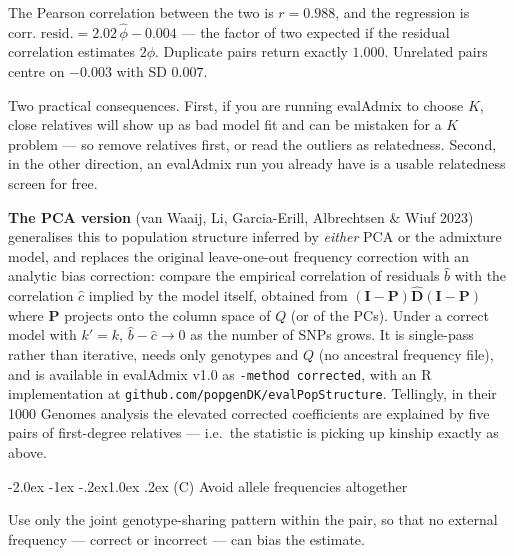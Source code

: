\documentclass[10pt,a4paper]{article}
\makeatletter
\renewcommand\subsection{\@startsection{subsection}{2}{\z@}%
  {-2.0ex \@plus -1ex \@minus -.2ex}{1.0ex \@plus.2ex}%
  {\normalfont\normalsize\bfseries\color{hdr}}}
\makeatother
\begin{document}
\noindent
The Pearson correlation between the two is $r=0.988$, and the regression is
$\text{corr.\ resid.} = 2.02\,\hat\phi - 0.004$ --- the factor of two expected if the residual correlation
estimates $2\phi$. Duplicate pairs return exactly $1.000$. Unrelated pairs centre on $-0.003$ with
SD $0.007$.

Two practical consequences. First, if you are running evalAdmix to choose $K$, close relatives will show up
as bad model fit and can be mistaken for a $K$ problem --- so remove relatives first, or read the outliers
as relatedness. Second, in the other direction, an evalAdmix run you already have is a usable relatedness
screen for free.

\textbf{The PCA version} (van Waaij, Li, Garcia-Erill, Albrechtsen \& Wiuf 2023) generalises this to
population structure inferred by \emph{either} PCA or the admixture model, and replaces the original
leave-one-out frequency correction with an analytic bias correction: compare the empirical correlation of
residuals $\hat b$ with the correlation $\hat c$ implied by the model itself, obtained from
$(\mathbf{I}-\mathbf{P})\hat{\mathbf{D}}(\mathbf{I}-\mathbf{P})$ where $\mathbf{P}$ projects onto the column
space of $Q$ (or of the PCs). Under a correct model with $k'=k$, $\hat b - \hat c \to 0$ as the number of
SNPs grows. It is single-pass rather than iterative, needs only genotypes and $Q$ (no ancestral frequency
file), and is available in evalAdmix v1.0 as \texttt{-method corrected}, with an R implementation at
\texttt{github.com/popgenDK/evalPopStructure}. Tellingly, in their 1000 Genomes analysis the elevated
corrected coefficients are explained by five pairs of first-degree relatives --- i.e.\ the statistic
is picking up kinship exactly as above.

\subsection{(C) Avoid allele frequencies altogether}

Use only the joint genotype-sharing pattern within the pair, so that no external frequency --- correct or
incorrect --- can bias the estimate.
\end{document}
